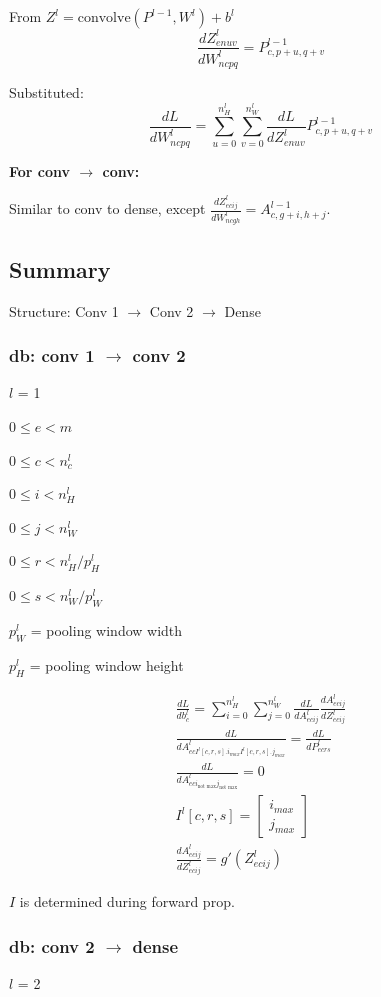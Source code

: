 \documentclass[12pt]{article}
\begin{document}
From $Z^l = \text{convolve}(P^{l-1},W^l) + b^l$
\[ \frac{dZ^l_{enuv}}{dW^l_{ncpq}} = P^{l-1}_{c,p+u,q+v} \]

Substituted:
\[ \frac{dL}{dW^l_{ncpq}} = \sum_{u=0}^{n_H^l} \sum_{v=0}^{n_W^l} \frac{dL}{dZ^l_{enuv}}
P^{l-1}_{c,p+u,q+v} \]

\textbf{For conv $\rightarrow$ conv:}

Similar to conv to dense, except $\frac{dZ^l_{ecij}}{dW^l_{ncgh}} = A^{l-1}_{c,g+i,h+j}$.

\subsection{Summary}

Structure: Conv 1 $\rightarrow$ Conv 2 $\rightarrow$ Dense

\subsubsection{db: conv 1 $\rightarrow$ conv 2}
$l$ = 1

$0 \le e < m$

$0 \le c < n^l_c$

$0 \le i < n_H^l$

$0 \le j < n^l_W$

$0 \le r < n_H^l/p_H^l$

$0 \le s < n_W^l/p_W^l$

$p_W^l$ = pooling window width

$p_H^l$ = pooling window height

\begin{gather*}
    \frac{dL}{db^l_c} = \sum_{i=0}^{n^l_H} \sum_{j=0}^{n_W^l} \frac{dL}{dA^l_{ecij}}
    \frac{dA^l_{ecij}}{dZ^l_{ecij}}\\
    \frac{dL}{dA^l_{ec I^l[c,r,s].i_{max} I^l[c,r,s].j_{max}}} = \frac{dL}{dP^l_{ecrs}}\\
    \frac{dL}{dA^l_{ec i_{\text{not max}} j_{\text{not max}}}} = 0\\
    I^l[c,r,s] = \begin{bmatrix}i_{max}\\j_{max}\end{bmatrix}\\
    \frac{dA^l_{ecij}}{dZ^l_{ecij}} = g'(Z^l_{ecij})
\end{gather*}

$I$ is determined during forward prop.

\subsubsection{db: conv 2 $\rightarrow$ dense}
$l$ = 2
\end{document}
